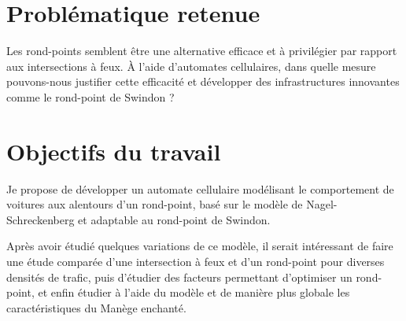 \documentclass[11pt,a4paper,french]{article}
\begin{document}
\section*{Problématique retenue}

Les rond-points semblent être une alternative efficace et à privilégier par rapport aux intersections à feux. À l'aide d'automates cellulaires, dans quelle mesure pouvons-nous justifier cette efficacité et développer des infrastructures innovantes comme le rond-point de Swindon ?

\section*{Objectifs du travail}
Je propose de développer un automate cellulaire modélisant le comportement de voitures aux alentours d'un rond-point, basé sur le modèle de Nagel-Schreckenberg et adaptable au rond-point de Swindon. \par
Après avoir étudié quelques variations de ce modèle, il serait intéressant de faire une étude comparée d'une intersection à feux et d'un rond-point pour diverses densités de trafic, puis d'étudier des facteurs permettant d'optimiser un rond-point, et enfin étudier à l'aide du modèle et de manière plus globale les caractéristiques du Manège enchanté.


\renewcommand{\refname}{Bibliographie}


\end{document}

